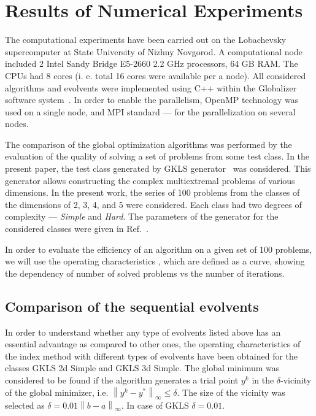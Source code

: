 \documentclass[runningheads]{llncs}
\begin{document}
\section{Results of Numerical Experiments}

The computational experiments have been carried out on the Lobachevsky supercomputer at
State University of Nizhny Novgorod. A computational node included 2 Intel
Sandy Bridge E5-2660 2.2 GHz processors, 64 GB RAM. The CPUs had 8 cores (i. e. total 16
cores were available per a node). All considered algorithms and evolvents were implemented
using C++ within the Globalizer software system~\cite{globalizerSystem}.
In order to enable the parallelism,
OpenMP technology was used on a single node, and MPI standard --- for the parallelization on
several nodes.

The comparison of the global optimization algorithms was performed by the evaluation of the
quality of solving a set of problems from some test class.
In the present paper, the test class generated by GKLS generator~\cite{Gaviano2003} was
considered. This generator allows constructing the complex multiextremal problems of various
dimensions. In the present work, the series of 100 problems from the classes of the dimensions
of 2, 3, 4, and 5 were considered.
Each class had two degrees of complexity --- \textit{Simple} and \textit{Hard}. The parameters
of the generator for the considered classes were given in Ref.~\cite{Gaviano2003}.


In order to evaluate the efficiency of an algorithm on a given set of 100 problems, we will use
the operating characteristics \cite{grishaginClass}, which are defined as a
curve, showing the dependency of number of solved problems vs the number of iterations.

\subsection{Comparison of the sequential evolvents}
\label{sec:seq_comp}
In order to understand whether any type of evolvents listed above has an essential advantage as
compared to other ones, the operating characteristics of the index method with different types
of evolvents have been obtained for the classes GKLS 2d Simple and GKLS 3d Simple. The
global minimum was considered to be found if the algorithm generates a trial point $y^k$ in the
$\delta$-vicinity of the global minimizer, i.e. $\left\|y^k-y^\ast\right\|_\infty\leq\delta$. The size
of the vicinity was selected as $\delta = 0.01\left\|b-a\right\|_\infty$. In case of GKLS
$\delta=0.01$.
\end{document}
